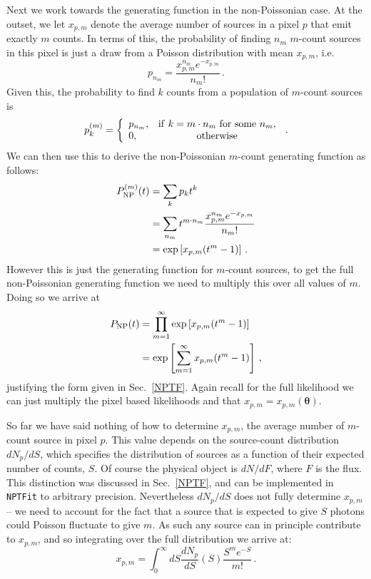 Next we work towards the generating function in the non-Poissonian case. At the outset, we let $x_{p,m}$ denote the average number of sources in a pixel $p$ that emit exactly $m$ counts. In terms of this, the probability of finding $n_m$ $m$-count sources in this pixel is just a draw from a Poisson distribution with mean $x_{p,m}$, i.e.
\begin{equation}
p_{n_m} = \frac{x_{p,m}^{n_m} e^{-x_{p,m}}}{n_m!}\,.
\end{equation}
Given this, the probability to find $k$ counts from a population of $m$-count sources is
\begin{equation}
p_k^{(m)} = \left\{ \begin{array}{lc} p_{n_m}, & {\rm if}~k=m \cdot n_m~{\rm for~some~}n_m, \\ 0, & {\rm otherwise} \end{array} \right.\,.
\end{equation}
We can then use this to derive the non-Poissonian $m$-count generating function as follows:
\begin{equation}\begin{aligned}
P_{\rm NP}^{(m)}(t) &= \sum_k p_k t^k \\
&= \sum_{n_m} t^{m \cdot n_m} \frac{x_{p,m}^{n_m}e^{-x_{p,m}}}{n_m!} \\
&= \exp \left[ x_{p,m} (t^m - 1) \right]\,.
\end{aligned}\end{equation}
However this is just the generating function for $m$-count sources, to get the full non-Poissonian generating function we need to multiply this over all values of $m$. Doing so we arrive at
\begin{equation}\begin{aligned}
P_{\rm NP}(t) &= \prod_{m=1}^{\infty} \exp \left[ x_{p,m} (t^m - 1) \right] \\
&= \exp \left[ \sum_{m=1}^{\infty} x_{p,m} (t^m - 1) \right]\,,
\end{aligned}\end{equation}
justifying the form given in Sec.~\ref{NPTF}. Again recall for the full likelihood we can just multiply the pixel based likelihoods and that  $x_{p,m} = x_{p,m}(\bm{\theta})$.

So far we have said nothing of how to determine $x_{p,m}$, the average number of $m$-count source in pixel $p$. This value depends on the source-count distribution $dN_p/dS$, which specifies the distribution of sources as a function of their expected number of counts, $S$. Of course the physical object is $dN/dF$, where $F$ is the flux. This distinction was discussed in Sec.~\ref{NPTF}, and can be implemented in \texttt{NPTFit} to arbitrary precision. Nevertheless $dN_p/dS$ does not fully determine $x_{p,m}$ -- we need to account for the fact that a source that is expected to give $S$ photons could Poisson fluctuate to give $m$. As such any source can in principle contribute to $x_{p,m}$, and so integrating over the full distribution we arrive at:
\begin{equation}
x_{p,m} = \int_0^{\infty} dS \frac{dN_p}{dS}(S) \frac{S^m e^{-S}}{m!}\,.
\label{eq:xpm}
\end{equation}

